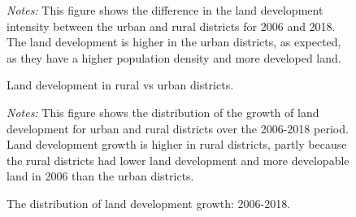 \documentclass[
  12pt,
]{article}
\begin{document}
\begin{figure}


\caption{\label{fig-developed-fraction-histogram}Land development in
rural vs urban districts.}
\begin{minipage}{0.975\textwidth}
\small
\emph{Notes:} This
figure shows the difference in the land development intensity between
the urban and rural districts for 2006 and 2018. The land development is
higher in the urban districts, as expected, as they have a higher
population density and more developed
land.
\end{minipage}


\end{figure}%

\begin{figure}


\caption{\label{fig-developed-fraction-growth}The distribution of land
development growth: 2006-2018.}
\begin{minipage}{0.975\textwidth}
\small
\emph{Notes:}
This figure shows the distribution of the growth of land development for
urban and rural districts over the 2006-2018 period. Land development
growth is higher in rural districts, partly because the rural districts
had lower land development and more developable land in 2006 than the
urban districts.
\end{minipage}


\end{figure}%
\end{document}

